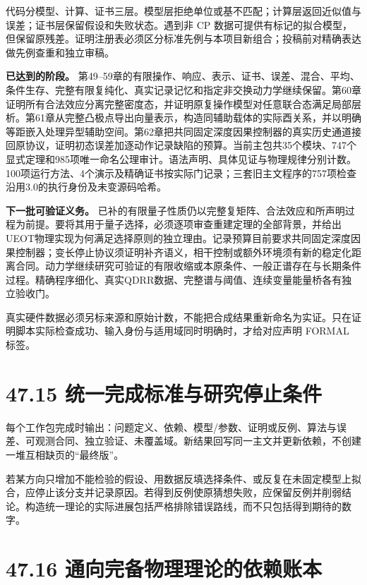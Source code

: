 \documentclass[
  11pt,
  oneside]{book}
\begin{document}
代码分模型、计算、证书三层。模型层拒绝单位或基不匹配；计算层返回近似值与误差；证书层保留假设和失败状态。遇到非
CP
数据可提供有标记的拟合模型，但保留原残差。证明注册表必须区分标准先例与本项目新组合；投稿前对精确表达做先例查重和独立审稿。

\textbf{已达到的阶段。}
第49--59章的有限操作、响应、表示、证书、误差、混合、平均、条件生存、完整有限复纯化、真实记录记忆和指定非交换动力学继续保留。第60章证明所有合法效应分离完整密度态，并证明原复操作模型对任意联合态满足局部层析。第61章从完整凸极点导出向量表示，构造同辅助载体的实际酉关系，并以明确等距嵌入处理异型辅助空间。第62章把共同固定深度因果控制器的真实历史通道接回原协议，证明初态误差加逐动作记录缺陷的预算。当前主包共35个模块、747个显式定理和985项唯一命名公理审计。语法声明、具体见证与物理规律分别计数。100项运行方法、4个演示及精确证书按实际门记录；三套旧主文程序的757项检查沿用3.0的执行身份及未变源码哈希。

\textbf{下一批可验证义务。}
已补的有限量子性质仍以完整复矩阵、合法效应和所声明过程为前提。要将其用于量子选择，必须逐项审查重建定理的全部背景，并给出UEOT物理实现为何满足选择原则的独立理由。记录预算目前要求共同固定深度因果控制器；变长停止协议须证明补齐语义，相干控制或额外环境须有新的稳定化距离合同。动力学继续研究可验证的有限收缩或本原条件、一般正谱存在与长期条件过程。精确程序细化、真实QDRR数据、完整谱与阈值、连续变量能量桥各有独立验收门。

真实硬件数据必须另标来源和原始计数，不能把合成结果重新命名为实证。只在证明脚本实际检查成功、输入身份与适用域同时明确时，才给对应声明
FORMAL 标签。

\hypertarget{ux7edfux4e00ux5b8cux6210ux6807ux51c6ux4e0eux7814ux7a76ux505cux6b62ux6761ux4ef6}{%
\section{47.15
统一完成标准与研究停止条件}\label{ux7edfux4e00ux5b8cux6210ux6807ux51c6ux4e0eux7814ux7a76ux505cux6b62ux6761ux4ef6}}

每个工作包完成时输出：问题定义、依赖、模型/参数、证明或反例、算法与误差、可观测合同、独立验证、未覆盖域。新结果回写同一主文并更新依赖，不创建一堆互相缺页的``最终版''。

若某方向只增加不能检验的假设、用数据反填选择条件、或反复在未固定模型上拟合，应停止该分支并记录原因。若得到反例使原猜想失败，应保留反例并削弱结论。构造统一理论的实际进展包括严格排除错误路线，而不只包括得到期待的数字。

\hypertarget{ux901aux5411ux5b8cux5907ux7269ux7406ux7406ux8bbaux7684ux4f9dux8d56ux8d26ux672c}{%
\section{47.16
通向完备物理理论的依赖账本}\label{ux901aux5411ux5b8cux5907ux7269ux7406ux7406ux8bbaux7684ux4f9dux8d56ux8d26ux672c}}
\end{document}
